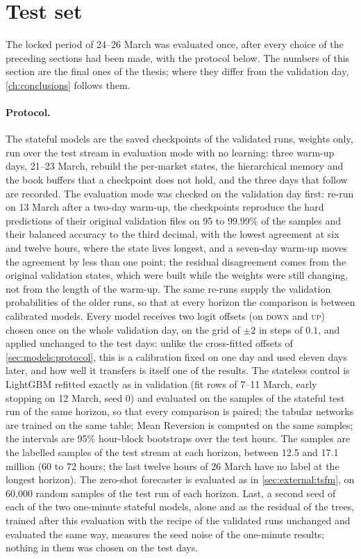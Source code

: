 \section{Test set}
\label{sec:horizons:test}

The locked period of 24--26 March was evaluated once, after every choice of the preceding
sections had been made, with the protocol below.  The numbers of this section are the final
ones of the thesis; where they differ from the validation day, \cref{ch:conclusions}
follows them.

\paragraph{Protocol.}  The stateful models are the saved checkpoints of the validated runs,
weights only, run over the test stream in evaluation mode with no learning: three warm-up
days, 21--23 March, rebuild the per-market states, the hierarchical memory and the book
buffers that a checkpoint does not hold, and the three days that follow are recorded.  The
evaluation mode was checked on the validation day first: re-run on 13 March after a two-day
warm-up, the checkpoints reproduce the hard predictions of their original validation files
on 95 to 99.99\% of the samples and their balanced accuracy to the third decimal, with the
lowest agreement at six and twelve hours, where the state lives longest, and a seven-day
warm-up moves the agreement by less than one point; the residual disagreement comes from the
original validation states, which were built while the weights were still changing, not
from the length of the warm-up.  The same re-runs supply the validation probabilities of
the older runs, so that at every horizon the comparison is between calibrated models.  Every
model receives two logit offsets (on \textsc{down} and \textsc{up}) chosen once on the whole
validation day, on the grid of $\pm 2$ in steps of $0.1$, and applied unchanged to the test
days: unlike the cross-fitted offsets of \cref{sec:models:protocol}, this is a calibration
fixed on one day and used eleven days later, and how well it transfers is itself one of the
results.  The stateless control is LightGBM refitted exactly as in validation (fit rows of
7--11 March, early stopping on 12 March, seed 0) and evaluated on the samples of the stateful
test run of the same horizon, so that every comparison is paired; the tabular networks are
trained on the same table; Mean Reversion is computed on the same samples; the intervals are
95\% hour-block bootstraps over the test hours.  The samples are the labelled samples of the
test stream at each horizon, between 12.5 and 17.1 million (60 to 72 hours; the last twelve
hours of 26 March have no label at the longest horizon).  The zero-shot forecaster is
evaluated as in \cref{sec:external:tsfm}, on 60{,}000 random samples of the test run of each
horizon.  Last, a second seed of each of the two one-minute stateful models, alone and as
the residual of the trees, trained after this evaluation with the recipe of the validated
runs unchanged and evaluated the same way, measures the seed noise of the one-minute
results; nothing in them was chosen on the test days.

